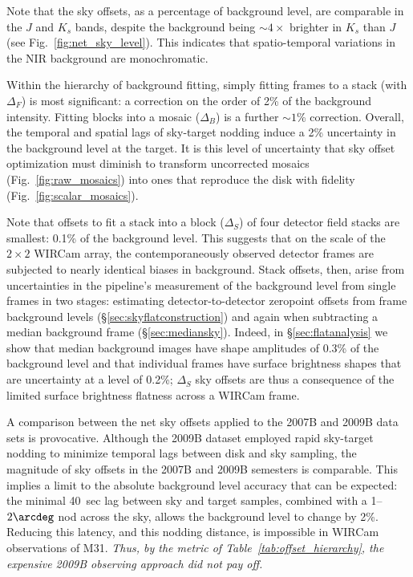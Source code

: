 \documentclass[iop]{emulateapj}
\newcommand{\Fig}[1]{Fig.~\ref{fig:#1}}  %
\newcommand{\Tab}[1]{Table~\ref{tab:#1}}  %
\newcommand{\Sec}[1]{\S\ref{sec:#1}}  %
\begin{document}

Note that the sky offsets, as a percentage of background level, are comparable in the $J$ and $K_s$ bands, despite the background being $\sim 4\times$ brighter in $K_s$ than $J$ (see \Fig{net_sky_level}).
This indicates that spatio-temporal variations in the NIR background are monochromatic.

Within the hierarchy of background fitting, simply fitting frames to a stack (with $\Delta_F$) is most significant: a correction on the order of 2\% of the background intensity.
Fitting blocks into a mosaic ($\Delta_B$) is a further $\sim 1$\% correction.
Overall, the temporal and spatial lags of sky-target nodding induce a 2\% uncertainty in the background level at the target.
It is this level of uncertainty that sky offset optimization must diminish to transform uncorrected mosaics (\Fig{raw_mosaics}) into ones that reproduce the disk with fidelity (\Fig{scalar_mosaics}).

Note that offsets to fit a stack into a block ($\Delta_S$) of four detector field stacks are smallest: 0.1\% of the background level.
This suggests that on the scale of the $2\times 2$ WIRCam array, the contemporaneously observed detector frames are subjected to nearly identical biases in background.
Stack offsets, then, arise from uncertainties in the pipeline's measurement of the background level from single frames in two stages: estimating detector-to-detector zeropoint offsets from frame background levels (\Sec{skyflatconstruction}) and again when subtracting a median background frame (\Sec{mediansky}).
Indeed, in \Sec{flatanalysis} we show that median background images have shape amplitudes of 0.3\% of the background level and that individual frames have surface brightness shapes that are uncertainty at a level of 0.2\%; $\Delta_S$ sky offsets are thus a consequence of the limited surface brightness flatness across a WIRCam frame.

A comparison between the net sky offsets applied to the 2007B and 2009B data sets is provocative.
Although the 2009B dataset employed rapid sky-target nodding to minimize temporal lags between disk and sky sampling, the magnitude of sky offsets in the 2007B and 2009B semesters is comparable.
This implies a limit to the absolute background level accuracy that can be expected: the minimal 40~sec lag between sky and target samples, combined with a 1--$2\arcdeg$ nod across the sky, allows the background level to change by 2\%.
Reducing this latency, and this nodding distance, is impossible in WIRCam observations of M31.
\emph{Thus, by the metric of \Tab{offset_hierarchy}, the expensive 2009B observing approach did not pay off.}
\end{document}

